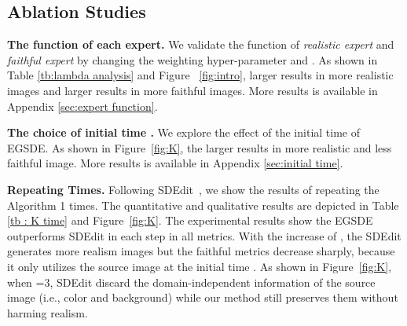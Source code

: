 \documentclass{article}
\begin{document}
\subsection{Ablation Studies}
\label{ablation studies}
\textbf{The function of each expert.} We validate the function of \emph{realistic expert}  and \emph{faithful expert}  by changing the weighting hyper-parameter  and . As shown in Table \ref{tb:lambda analysis} and Figure ~\ref{fig:intro}, larger  results in more realistic images and larger  results in more faithful images. More results is available in Appendix \ref{sec:expert function}.

\textbf{The choice of initial time .} We explore the effect of the initial time  of EGSDE. As shown in Figure~\ref{fig:K}, the larger  results in more realistic and less faithful image. More results is available in Appendix \ref{sec:initial time}.

\textbf{Repeating  Times.} Following SDEdit~\cite{meng2021sdedit}, we show the results of repeating the Algorithm 1  times. The quantitative and qualitative results are depicted in Table \ref{tb : K time} and Figure~\ref{fig:K}. The experimental results show the EGSDE outperforms SDEdit in each  step in all metrics. With the increase of , the SDEdit generates more realism images but the faithful metrics decrease sharply, because it only utilizes the source image at the initial time . As shown in Figure~\ref{fig:K}, when =3, SDEdit discard the domain-independent information of the source image (i.e., color and background) while our method still preserves them without harming realism.
\end{document}
